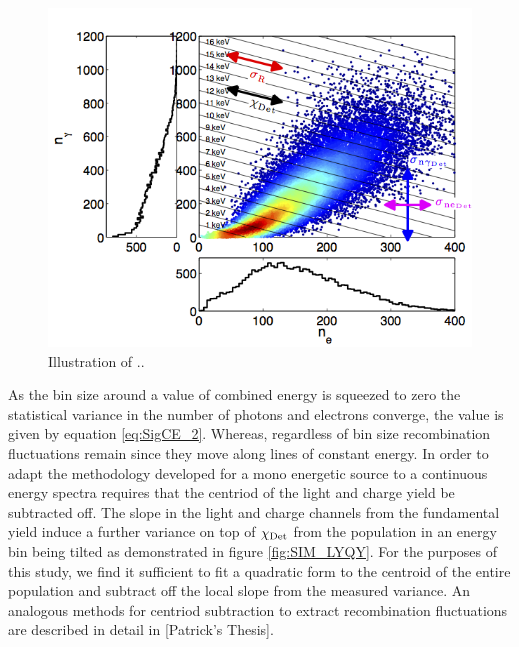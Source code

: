 \renewcommand{\baselinestretch}{1}
\small\normalsize
\begin{figure}[h!]\centering
\includegraphics[width=130mm]{Chapter_Flucs/Figures/EX_Plots/EX_T_Stat_R.png}
\caption{Illustration of ..}
\label{fig:T_R_Stat}
\end{figure}
\renewcommand{\baselinestretch}{2}
\small\normalsize



As the bin size around a value of combined energy is squeezed to zero the statistical variance in the number of photons and electrons converge, the value is given by equation \ref{eq:SigCE_2}. Whereas, regardless of bin size recombination fluctuations remain since they move along lines of constant energy. In order to adapt the methodology developed for a mono energetic source to a continuous energy spectra requires that the centriod of the light and charge yield be subtracted off. The slope in the light and charge channels from the fundamental yield  induce a further variance on top of $\rm \chi_{Det}$ from the population in an energy bin being tilted as demonstrated in figure \ref{fig:SIM_LYQY}. For the purposes of this study, we find it sufficient to fit a quadratic form to the centroid of the entire population and subtract off the local slope from the measured variance. An analogous methods for centriod subtraction to extract recombination fluctuations are described in detail in [Patrick's Thesis].



